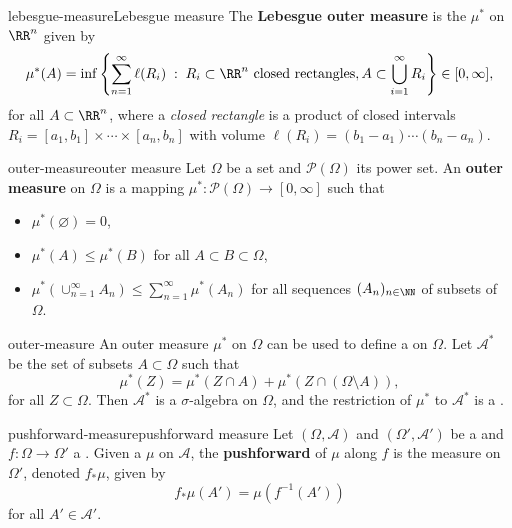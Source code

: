 \begin{topic}{lebesgue-measure}{Lebesgue measure}
    The \textbf{Lebesgue outer measure} is the  $\mu^*$ on $\RR^n$ given by
    \[ \mu^*(A) = \inf \left\{ \sum_{n = 1}^{\infty} \ell(R_i) \;:\; R_i \subset \RR^n \textup{ closed rectangles}, A \subset \bigcup_{i = 1}^{\infty} R_i \right\} \in [0, \infty] , \]
    for all $A \subset \RR^n$, where a \textit{closed rectangle} is a product of closed intervals $R_i = [a_1, b_1] \times \cdots \times [a_n, b_n]$ with volume $\ell(R_i) =  (b_1 - a_1) \cdots (b_n - a_n)$.
\end{topic}

\begin{topic}{outer-measure}{outer measure}
    Let $\Omega$ be a set and $\mathcal{P}(\Omega)$ its power set. An \textbf{outer measure} on $\Omega$ is a mapping $\mu^* : \mathcal{P}(\Omega) \to [0, \infty]$ such that
    \begin{itemize}
        \item $\mu^*(\varnothing) = 0$,
        \item $\mu^*(A) \le \mu^*(B)$ for all $A \subset B \subset \Omega$,
        \item $\mu^*\left(\cup_{n = 1}^{\infty} A_n \right) \le \sum_{n = 1}^{\infty} \mu^*(A_n)$ for all sequences $(A_n)_{n \in \NN}$ of subsets of $\Omega$.
    \end{itemize}
\end{topic}

\begin{example}{outer-measure}
    An outer measure $\mu^*$ on $\Omega$ can be used to define a  on $\Omega$. Let $\mathcal{A}^*$ be the set of subsets $A \subset \Omega$ such that
    \[ \mu^*(Z) = \mu^*(Z \cap A) + \mu^*(Z \cap (\Omega \setminus A)) , \]
    for all $Z \subset \Omega$. Then $\mathcal{A}^*$ is a $\sigma$-algebra on $\Omega$, and the restriction of $\mu^*$ to $\mathcal{A}^*$ is a .
\end{example}

\begin{topic}{pushforward-measure}{pushforward measure}
    Let $(\Omega, \mathcal{A})$ and $(\Omega', \mathcal{A}')$ be a  and $f : \Omega \to \Omega'$ a . Given a  $\mu$ on $\mathcal{A}$, the \textbf{pushforward} of $\mu$ along $f$ is the measure on $\Omega'$, denoted $f_* \mu$, given by
    \[ f_* \mu (A') = \mu(f^{-1}(A')) \]
    for all $A' \in \mathcal{A}'$.
\end{topic}
